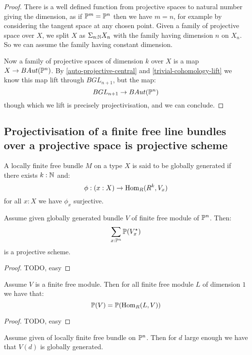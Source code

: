 \begin{proof}
There is a well defined function from projective spaces to natural number giving the dimension, as if $\mathbb{P}^m = \mathbb{P}^n$ then we have $m=n$, for example by considering the tangent space at any chosen point. Given a family of projective space over $X$, we split $X$ as $\Sigma_{n:\mathbb{N}}X_n$ with the family having dimension $n$ on $X_n$. So we can assume the family having constant dimension.

Now a family of projective spaces of dimension $k$ over $X$ is a map $X\to BAut(\mathbb{P}^n)$. By \cref{auto-projective-central} and \cref{trivial-cohomology-lift} we know this map lift through $BGL_{n+1}$, but the map:
\[BGL_{n+1} \to BAut(\mathbb{P}^n)\]
though which we lift is precisely projectivisation, and we can conclude.
\end{proof}

\subsection{Projectivisation of a finite free line bundles over a projective space is projective scheme}

\begin{lemma}
A locally finite free bundle $M$ on a type $X$ is said to be globally generated if there exists $k:\mathbb{N}$ and:
\[\phi : (x:X) \to \mathrm{Hom}_R(R^k,V_x)\]
for all $x:X$ we have $\phi_x$ surjective.
\end{lemma}

\begin{lemma}\label{projectivisation-globally-generated-bundle-over-Pn-projective}
Assume given globally generated bundle $V$ of finite free module of $\mathbb{P}^n$. Then:
\[\sum_{x:\mathbb{P}^n}\mathbb{P}(V^\star_x)\]
is a projective scheme.
\end{lemma}

\begin{proof}
TODO, easy
\end{proof}

\begin{lemma}\label{twisting-invariant-projectivisation}
Assume $V$ is a finite free module. Then for all finite free module $L$ of dimension $1$ we have that:
\[\mathbb{P}(V) = \mathbb{P}(\mathrm{Hom}_R(L,V))\]
\end{lemma}

\begin{proof}
TODO, easy
\end{proof}

\begin{lemma}\label{twisted-enough-globally-generated}
Assume given of locally finite free bundle on $\mathbb{P}^n$. Then for $d$ large enough we have that $V(d)$ is globally generated.
\end{lemma}

